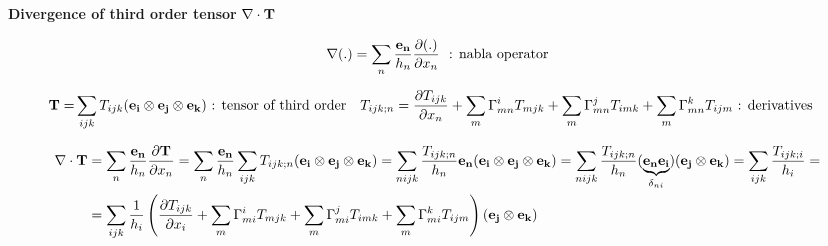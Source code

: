 \documentclass[11pt]{article}
\begin{document}
\begin{landscape}
\newpage

\noindent
{{\bf{Divergence of third order tensor}} $\nabla \cdot {\bf{T}}$}

\begin{align}
\nabla (.) = \sum_n \frac{{\bf{e_n}}}{h_n}\frac{\partial (.)}{\partial x_n} \ \ \mbox{: nabla operator} \nonumber
\end{align}

\begin{align}
{\bf{T}} = &  \sum_{ijk} T_{ijk} ({\bf{e_i}} \otimes {\bf{e_j}} \otimes {\bf{e_k}}) \ \mbox{: tensor of third order} && T_{ijk;n} = \frac{\partial T_{ijk}}{\partial x_n} + \sum_m \Gamma_{mn}^i T_{mjk} + \sum_m \Gamma_{mn}^j T_{imk} + \sum_m \Gamma_{mn}^k T_{ijm} \ \mbox{: derivatives} \nonumber
\end{align}

\begin{align}
\nabla \cdot {\bf{T}} & = \sum_n \frac{{\bf{e_n}}}{h_n}\frac{\partial {\bf{T}}}{\partial x_n} = \sum_n \frac{{\bf{e_n}}}{h_n} \sum_{ijk} T_{ijk;n} ({\bf{e_i}} \otimes {\bf{e_j}} \otimes {\bf{e_k}}) = \sum_{nijk} \frac{T_{ijk;n}}{h_n} {\bf{e_n}}({\bf{e_i}} \otimes {\bf{e_j}} \otimes {\bf{e_k}}) = \sum_{nijk} \frac{T_{ijk;n}}{h_n} (\underbrace{{\bf{e_n}}{\bf{e_i}}}_\text{$\delta_{ni}$})({\bf{e_j}}\otimes {\bf{e_k}}) =  \sum_{ijk} \frac{T_{ijk;i}}{h_i} = \nonumber \\ 
& = \sum_{ijk} \frac{1}{h_i} \left(\frac{\partial T_{ijk}}{\partial x_i} + \sum_m \Gamma_{mi}^i T_{mjk} + \sum_m \Gamma_{mi}^j T_{imk} + \sum_m \Gamma_{mi}^k T_{ijm} \right)({\bf{e_j}} \otimes {\bf{e_k}})
\end{align}


\end{landscape}
\end{document}
